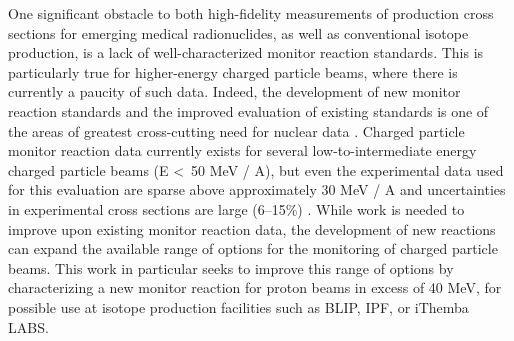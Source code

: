 \documentclass[%
 reprint,
superscriptaddress,
onecolumn,
linenumbers,
notitlepage,
 amsmath,amssymb,
 aps,
prc,
]{revtex4-1}
\newcommand{\comment}[1]{\todo[color=blue!20!white,inline]{ASV: #1}}
\begin{document}
One significant obstacle to both high-fidelity measurements of production cross sections for emerging medical radionuclides, as well as conventional isotope production, is a lack of well-characterized  monitor reaction standards.  
This is particularly true for higher-energy charged particle beams, where there is currently a paucity of such data. 
Indeed, the development of new monitor reaction standards and the improved evaluation of existing standards is one of the areas of greatest cross-cutting need for nuclear data \cite{bernstein2015nuclear}. 
Charged particle monitor reaction data currently exists for several low-to-intermediate energy charged particle beams (E \textless\ 50 MeV / A), but even the experimental data used for this evaluation are  sparse above approximately 30 MeV / A and  uncertainties in experimental cross sections are large (6--15\%) \cite{gul2001charged}. 
While work is needed to improve upon existing monitor reaction data, the development of new reactions can expand the available range of options for the monitoring of charged particle beams.
This work in particular seeks to improve this range of options by characterizing a new monitor reaction for  proton beams in excess of 40 MeV, for possible use at isotope production facilities such as BLIP, IPF, or iThemba LABS.
\end{document}
